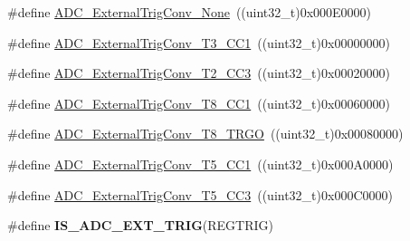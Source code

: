 \begin{DoxyCompactItemize}
\#define \hyperlink{group__ADC__external__trigger__sources__for__regular__channels__conversion_ga433a3845ed1792fa6359b763c955e9c2}{ADC\_\-ExternalTrigConv\_\-None}~((uint32\_\-t)0x000E0000)
\item 
\#define \hyperlink{group__ADC__external__trigger__sources__for__regular__channels__conversion_ga3c73d5c8bb0f898dbbc74bcc536f6ec1}{ADC\_\-ExternalTrigConv\_\-T3\_\-CC1}~((uint32\_\-t)0x00000000)
\item 
\#define \hyperlink{group__ADC__external__trigger__sources__for__regular__channels__conversion_ga16ae1b335f2c2b4facf3d4bedc2ce27f}{ADC\_\-ExternalTrigConv\_\-T2\_\-CC3}~((uint32\_\-t)0x00020000)
\item 
\#define \hyperlink{group__ADC__external__trigger__sources__for__regular__channels__conversion_ga97af875d12e77a67e84f3aaf1f8033ed}{ADC\_\-ExternalTrigConv\_\-T8\_\-CC1}~((uint32\_\-t)0x00060000)
\item 
\#define \hyperlink{group__ADC__external__trigger__sources__for__regular__channels__conversion_gab26d94590d47ae6ec46841652741abf3}{ADC\_\-ExternalTrigConv\_\-T8\_\-TRGO}~((uint32\_\-t)0x00080000)
\item 
\#define \hyperlink{group__ADC__external__trigger__sources__for__regular__channels__conversion_ga6bd1ad69cb455afeabf6759b640378d3}{ADC\_\-ExternalTrigConv\_\-T5\_\-CC1}~((uint32\_\-t)0x000A0000)
\item 
\#define \hyperlink{group__ADC__external__trigger__sources__for__regular__channels__conversion_ga95b58981aff35d6d5fa229925cd6315d}{ADC\_\-ExternalTrigConv\_\-T5\_\-CC3}~((uint32\_\-t)0x000C0000)
\item 
\#define {\bfseries IS\_\-ADC\_\-EXT\_\-TRIG}(REGTRIG)
\end{DoxyCompactItemize}


